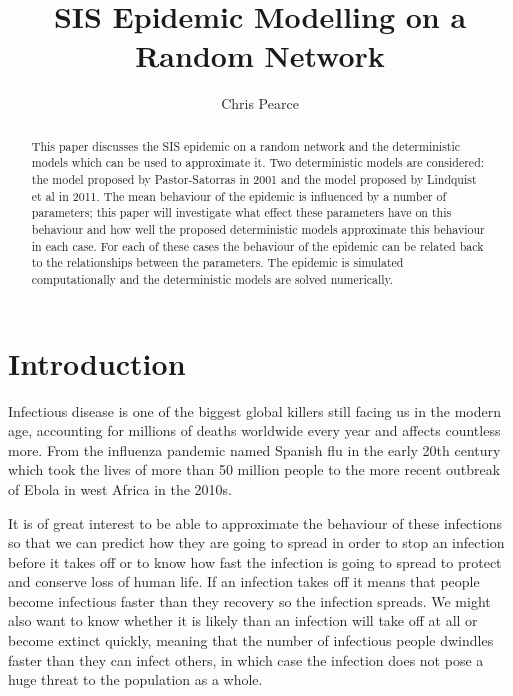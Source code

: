 \documentclass{uonmathsreport}
\title{SIS Epidemic Modelling on a Random Network}
\author{Chris Pearce}
\begin{document}
\maketitle
\newpage
\begin{abstract}

This paper discusses the SIS epidemic on a random network and the deterministic models which can be used to approximate it. Two deterministic models are considered: the model proposed by Pastor-Satorras in 2001 and the model proposed by Lindquist et al in 2011. The mean behaviour of the epidemic is influenced by a number of parameters; this paper will investigate what effect these parameters have on this behaviour and how well the proposed deterministic models approximate this behaviour in each case. For each of these cases the behaviour of the epidemic can be related back to the relationships between the parameters. The epidemic is simulated computationally and the deterministic models are solved numerically.

\end{abstract}
\setcounter{tocdepth}{2}  %
\newpage
\newpage
\tableofcontents
\newpage
\section{Introduction} \label{sec:2}

\indent
Infectious disease is one of the biggest global killers still facing us in the modern age, accounting for millions of deaths worldwide every year and affects countless more. From the influenza pandemic named Spanish flu in the early 20th century which took the lives of more than 50 million people to the more recent outbreak of Ebola in west Africa in the 2010s. 

It is of great interest to be able to approximate the behaviour of these infections so that we can predict how they are going to spread in order to stop an infection before it takes off or to know how fast the infection is going to spread to protect and conserve loss of human life. If an infection takes off it means that people become infectious faster than they recovery so the infection spreads.  We might also want to know whether it is likely than an infection will take off at all or become extinct quickly, meaning that the number of infectious people dwindles faster than they can infect others, in which case the infection does not pose a huge threat to the population as a whole.
\end{document}
